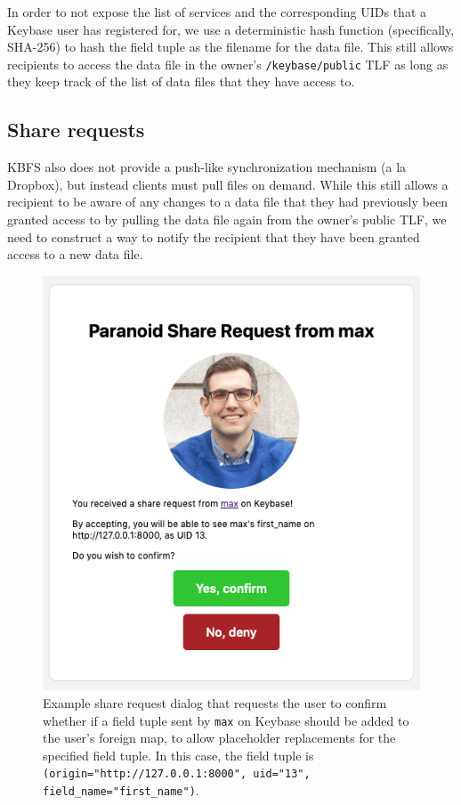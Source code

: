 \documentclass[letterpaper,twocolumn,10pt]{article}
\begin{document}
In order to not expose the list of services and the corresponding UIDs that a Keybase user has registered for, we use a deterministic hash function (specifically, SHA-256) to hash the field tuple as the filename for the data file. This still allows recipients to access the data file in the owner's \texttt{/keybase/public} TLF as long as they keep track of the list of data files that they have access to.

\subsection{Share requests}

KBFS also does not provide a push-like synchronization mechanism (a la Dropbox), but instead clients must pull files on demand. While this still allows a recipient to be aware of any changes to a data file that they had previously been granted access to by pulling the data file again from the owner's public TLF, we need to construct a way to notify the recipient that they have been granted access to a new data file.

\begin{figure}[]
    \centering
    \includegraphics[width=\columnwidth]{png/share_request.png}
    \caption{Example share request dialog that requests the user to confirm whether if a field tuple sent by \texttt{max} on Keybase should be added to the user's foreign map, to allow placeholder replacements for the specified field tuple. In this case, the field tuple is \texttt{(origin="http://127.0.0.1:8000", uid="13", field\_name="first\_name")}.}
    \label{fig:share_request}
\end{figure}
\end{document}
